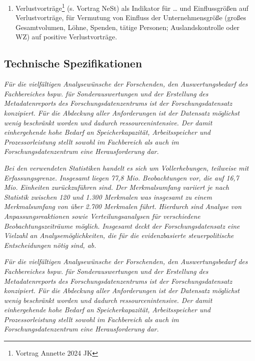 \documentclass[
  german,
  10pt,
  twoside]{article}
\providecommand{\tightlist}{%
  \setlength{\itemsep}{0pt}\setlength{\parskip}{0pt}}
\begin{document}
\begin{enumerate}
\def\labelenumi{\arabic{enumi}.}
\setcounter{enumi}{1}
\tightlist
\item
  Verlustvorträge\footnote{Vortrag Annette 2024 JK} (s. Vortrag NeSt)
  als Indikator für \ldots{} und Einflussgrößen auf Verlustvorträge, für
  Vermutung von Einfluss der Unternehmensgröße (großes Gesamtvolumen,
  Löhne, Spenden, tätige Personen; Auslandskontrolle oder WZ) auf
  positive Verlustvorträge.
\end{enumerate}

\subsection{Technische
Spezifikationen}\label{technische-spezifikationen}

\emph{Für die vielfältigen Analysewünsche der Forschenden, den
Auswertungsbedarf des Fachbereiches bspw. für Sonderauswertungen und der
Erstellung des Metadatenreports des Forschungsdatenzentrums ist der
Forschungsdatensatz konzipiert. Für die Abdeckung aller Anforderungen
ist der Datensatz möglichst wenig beschränkt worden und dadurch
ressourcenintensive. Der damit einhergehende hohe Bedarf an
Speicherkapazität, Arbeitsspeicher und Prozessorleistung stellt sowohl
im Fachbereich als auch im Forschungsdatenzentrum eine Herausforderung
dar.}

\emph{Bei den verwendeten Statistiken handelt es sich um Vollerhebungen,
teilweise mit Erfassungsgrenze. Insgesamt liegen 77,8 Mio. Beobachtungen
vor, die auf 16,7 Mio. Einheiten zurückzuführen sind. Der Merkmalsumfang
variiert je nach Statistik zwischen 120 und 1.300 Merkmalen was
insgesamt zu einem Merkmalsumfang von über 2.700 Merkmalen führt.
Hierdurch sind Analyse von Anpassungsreaktionen sowie
Verteilungsanalysen für verschiedene Beobachtungszeiträume möglich.
Insgesamt deckt der Forschungsdatensatz eine Vielzahl an
Analysemöglichkeiten, die für die evidenzbasierte steuerpolitische
Entscheidungen nötig sind, ab.}

\emph{Für die vielfältigen Analysewünsche der Forschenden, den
Auswertungsbedarf des Fachbereiches bspw. für Sonderauswertungen und der
Erstellung des Metadatenreports des Forschungsdatenzentrums ist der
Forschungsdatensatz konzipiert. Für die Abdeckung aller Anforderungen
ist der Datensatz möglichst wenig beschränkt worden und dadurch
ressourcenintensive. Der damit einhergehende hohe Bedarf an
Speicherkapazität, Arbeitsspeicher und Prozessorleistung stellt sowohl
im Fachbereich als auch im Forschungsdatenzentrum eine Herausforderung
dar.}
\end{document}
